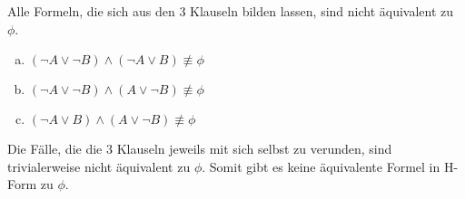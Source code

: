 \documentclass[a4paper,10pt]{article}
\begin{document}
\begin{enumerate}[(i)]
Alle Formeln, die sich aus den 3 Klauseln bilden lassen, sind nicht äquivalent zu $\phi$.

\begin{enumerate}[(a)]
\item
$(\lnot A \lor \lnot B) \land (\lnot A \lor B) \not \equiv \phi$
\item
$(\lnot A \lor \lnot B) \land (A \lor \lnot B) \not \equiv \phi$
\item
$(\lnot A \lor B) \land (A \lor \lnot B) \not \equiv \phi$
\end{enumerate}
Die Fälle, die die 3 Klauseln jeweils mit sich selbst zu verunden, sind trivialerweise nicht äquivalent zu $\phi$.
Somit gibt es keine äquivalente Formel in H-Form zu $\phi$.
\end{enumerate}
\end{document}
